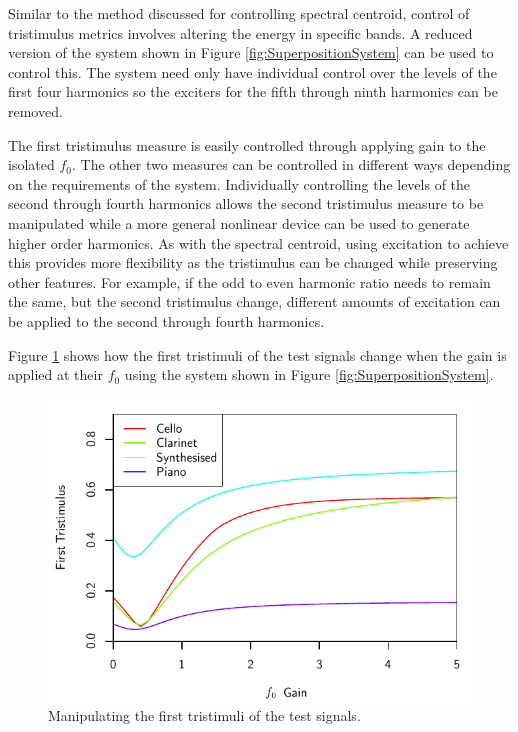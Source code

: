 		Similar to the method discussed for controlling spectral centroid, control of tristimulus metrics involves
		altering the energy in specific bands. A reduced version of the system shown in Figure
		\ref{fig:SuperpositionSystem} can be used to control this. The system need only have individual control
		over the levels of the first four harmonics so the exciters for the fifth through ninth harmonics can be
		removed.

		The first tristimulus measure is easily controlled through applying gain to the isolated $f_{0}$.  The
		other two measures can be controlled in different ways depending on the requirements of the system.
		Individually controlling the levels of the second through fourth harmonics allows the second tristimulus
		measure to be manipulated while a more general nonlinear device can be used to generate higher order
		harmonics. As with the spectral centroid, using excitation to achieve this provides more flexibility as the
		tristimulus can be changed while preserving other features. For example, if the odd to even harmonic ratio
		needs to remain the same, but the second tristimulus change, different amounts of excitation can be applied
		to the second through fourth harmonics.

		Figure \ref{fig:MoveTristimulus1} shows how the first tristimuli of the test signals change when the gain
		is applied at their $f_{0}$ using the system shown in Figure \ref{fig:SuperpositionSystem}.

		\begin{figure}[h!]
			\centering
			\includegraphics{chapter6/Images/MoveTristimulus1.pdf}
			\caption{Manipulating the first tristimuli of the test signals.}
			\label{fig:MoveTristimulus1}
		\end{figure}

